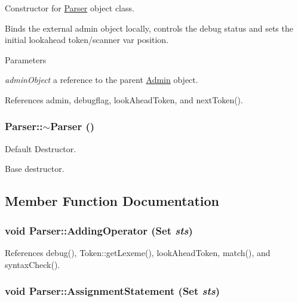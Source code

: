 Constructor for \hyperlink{classParser}{Parser} object class.

Binds the external admin object locally, controls the debug status and sets the initial lookahead token/scanner var position.


\begin{DoxyParams}{Parameters}
\item[{\em adminObject}]a reference to the parent \hyperlink{classAdmin}{Admin} object. \end{DoxyParams}


References admin, debugflag, lookAheadToken, and nextToken().

\hypertarget{classParser_a3e658b5917a93a3ef648050d060e3a93}{
\subsubsection[{$\sim$Parser}]{\setlength{\rightskip}{0pt plus 5cm}Parser::$\sim$Parser ()}}
\label{classParser_a3e658b5917a93a3ef648050d060e3a93}


Default Destructor. 

Base destructor.

\subsection{Member Function Documentation}
\hypertarget{classParser_a909c968479dd3bafe797f2409e197179}{
\subsubsection[{AddingOperator}]{\setlength{\rightskip}{0pt plus 5cm}void Parser::AddingOperator ({\bf Set} {\em sts})}}
\label{classParser_a909c968479dd3bafe797f2409e197179}


References debug(), Token::getLexeme(), lookAheadToken, match(), and syntaxCheck().

\hypertarget{classParser_a472a0dc9ed06ffc3ec260992ae7197ca}{
\subsubsection[{AssignmentStatement}]{\setlength{\rightskip}{0pt plus 5cm}void Parser::AssignmentStatement ({\bf Set} {\em sts})}}
\label{classParser_a472a0dc9ed06ffc3ec260992ae7197ca}


